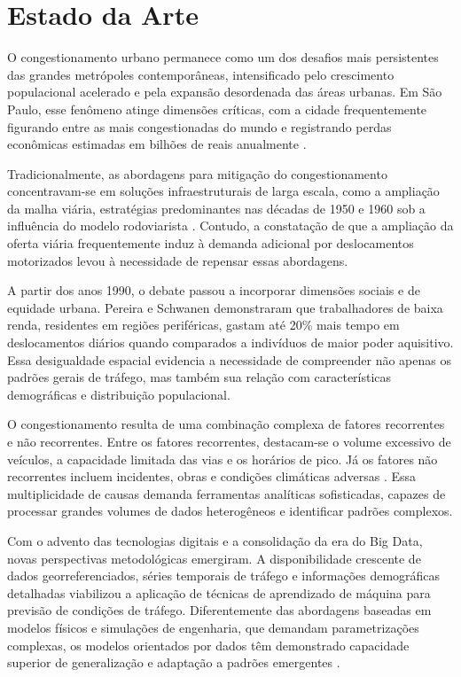 \documentclass[conference]{IEEEtran}
\begin{document}
\section{Estado da Arte}
O congestionamento urbano permanece como um dos desafios mais persistentes das grandes metrópoles contemporâneas, intensificado pelo crescimento populacional acelerado e pela expansão desordenada das áreas urbanas. Em São Paulo, esse fenômeno atinge dimensões críticas, com a cidade frequentemente figurando entre as mais congestionadas do mundo e registrando perdas econômicas estimadas em bilhões de reais anualmente \cite{3}.

Tradicionalmente, as abordagens para mitigação do congestionamento concentravam-se em soluções infraestruturais de larga escala, como a ampliação da malha viária, estratégias predominantes nas décadas de 1950 e 1960 sob a influência do modelo rodoviarista \cite{1}. Contudo, a constatação de que a ampliação da oferta viária frequentemente induz à demanda adicional por deslocamentos motorizados levou à necessidade de repensar essas abordagens.

A partir dos anos 1990, o debate passou a incorporar dimensões sociais e de equidade urbana. Pereira e Schwanen \cite{4} demonstraram que trabalhadores de baixa renda, residentes em regiões periféricas, gastam até 20\% mais tempo em deslocamentos diários quando comparados a indivíduos de maior poder aquisitivo. Essa desigualdade espacial evidencia a necessidade de compreender não apenas os padrões gerais de tráfego, mas também sua relação com características demográficas e distribuição populacional.

O congestionamento resulta de uma combinação complexa de fatores recorrentes e não recorrentes. Entre os fatores recorrentes, destacam-se o volume excessivo de veículos, a capacidade limitada das vias e os horários de pico. Já os fatores não recorrentes incluem incidentes, obras e condições climáticas adversas \cite{2}. Essa multiplicidade de causas demanda ferramentas analíticas sofisticadas, capazes de processar grandes volumes de dados heterogêneos e identificar padrões complexos.

Com o advento das tecnologias digitais e a consolidação da era do Big Data, novas perspectivas metodológicas emergiram. A disponibilidade crescente de dados georreferenciados, séries temporais de tráfego e informações demográficas detalhadas viabilizou a aplicação de técnicas de aprendizado de máquina para previsão de condições de tráfego. Diferentemente das abordagens baseadas em modelos físicos e simulações de engenharia, que demandam parametrizações complexas, os modelos orientados por dados têm demonstrado capacidade superior de generalização e adaptação a padrões emergentes \cite{5}.
\end{document}
